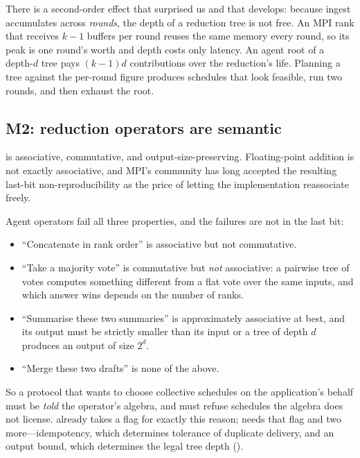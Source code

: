 There is a second-order effect that surprised us and that
 develops: because ingest accumulates across
\emph{rounds}, the depth of a reduction tree is not free. An MPI rank that
receives $k-1$ buffers per round reuses the same memory every round, so its
peak is one round's worth and depth costs only latency. An agent root of a
depth-$d$ tree pays $(k-1)d$ contributions over the reduction's life.
Planning a tree against the per-round figure produces schedules that look
feasible, run two rounds, and then exhaust the root.

\subsection{M2: reduction operators are semantic}
\label{sec:m2}

 is associative, commutative, and output-size-preserving.
Floating-point addition is not exactly associative, and MPI's community has
long accepted the resulting last-bit non-reproducibility as the price of
letting the implementation reassociate freely.

Agent operators fail all three properties, and the failures are not in the
last bit:

\begin{itemize}
\item ``Concatenate in rank order'' is associative but not commutative.
\item ``Take a majority vote'' is commutative but \emph{not} associative: a
pairwise tree of votes computes something different from a flat vote over
the same inputs, and which answer wins depends on the number of ranks.
\item ``Summarise these two summaries'' is approximately associative at
best, and its output must be strictly smaller than its input or a tree of
depth $d$ produces an output of size $2^d$.
\item ``Merge these two drafts'' is none of the above.
\end{itemize}

So a protocol that wants to choose collective schedules on the
application's behalf must be \emph{told} the operator's algebra, and must
refuse schedules the algebra does not license.  already
takes a  flag for exactly this reason; \ampi{} needs that flag
and two more---idempotency, which determines tolerance of duplicate
delivery, and an output bound, which determines the legal tree depth
().

